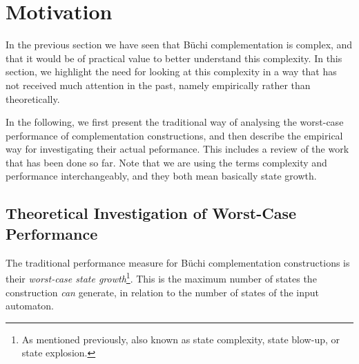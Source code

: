 

\section{Motivation}
\label{1_motivation}
In the previous section we have seen that Büchi complementation is complex, and that it would be of practical value to better understand this complexity. In this section, we highlight the need for looking at this complexity in a way that has not received much attention in the past, namely empirically rather than theoretically.

In the following, we first present the traditional way of analysing the worst-case performance of complementation constructions, and then describe the empirical way for investigating their actual peformance. This includes a review of the work that has been done so far. Note that we are using the terms complexity and performance interchangeably, and they both mean basically state growth.

\subsection{Theoretical Investigation of Worst-Case Performance}
The traditional performance measure for Büchi complementation constructions is their \textit{worst-case state growth}\footnote{As mentioned previously, also known as state complexity, state blow-up, or state explosion.}. This is the maximum number of states the construction \textit{can} generate, in relation to the number of states of the input automaton.

